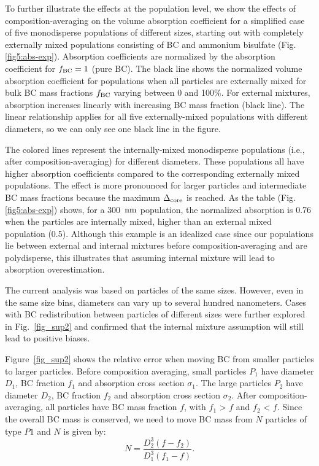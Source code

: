 \documentclass[edeposit,fullpage]{uiucthesis2009}
\makeatletter
\DeclareRobustCommand*\unit[1]
 {\ensuremath{%
   {\thinmuskip3mu\relax
    \def\mu{\text{\textmu}}\def~{\,}%
    \ifx\f@series\testbx\mathbf{#1}\else\mathrm{#1}\fi}}}
\makeatother
\begin{document}
To further illustrate the effects at the population level, we show the
effects of composition-averaging on the volume absorption coefficient
for a simplified case of five monodisperse populations of different
sizes, starting out with completely externally mixed populations
consisting of BC and ammonium bisulfate
(Fig.\ref{fig5:abs-exp}). Absorption coefficients are normalized by
the absorption coefficient for $f_{\rm BC} = 1$ (pure BC). The black
line shows the normalized volume absorption coefficient for
populations when all particles are externally mixed for bulk BC mass
fractions $f_{\rm BC}$ varying between 0 and 100\%. For external
mixtures, absorption increases linearly with increasing BC mass
fraction (black line). The linear relationship applies for all five
externally-mixed populations with different diameters, so we can only
see one black line in the figure.

The colored lines represent the internally-mixed monodisperse
populations (i.e., after composition-averaging) for different
diameters. These populations all have higher absorption coefficients
compared to the corresponding externally mixed populations. The effect
is more pronounced for larger particles and intermediate BC mass
fractions because the maximum $\Delta_{\rm core}$ is reached. As the
table (Fig.\ref{fig5:abs-exp}) shows, for a 300~\unit{nm} population,
the normalized absorption is 0.76 when the particles are internally
mixed, higher than an external mixed population (0.5). Although this
example is an idealized case since our populations lie between
external and internal mixtures before composition-averaging and are
polydisperse, this illustrates that assuming internal mixture will
lead to absorption overestimation.

The current analysis was based on particles of the same sizes. However,
even in the same size bins, diameters can vary up to several hundred
nanometers. Cases with BC redistribution between particles of
different sizes were further explored in Fig.~\ref{fig_sup2} and
confirmed that the internal mixture assumption will still lead to
positive biases.

Figure~\ref{fig_sup2} shows the relative error when moving BC
from smaller particles to larger particles. Before composition
averaging, small particles $P_1$ have diameter $D_1$, BC fraction
$f_1$ and absorption cross section $\sigma_1$. The large particles
$P_2$ have diameter $D_2$, BC fraction $f_2$ and absorption cross
section $\sigma_2$. After composition-averaging, all particles have BC
mass fraction $f$, with $f_1$ > $f$ and $f_2$ < $f$. Since the overall
BC mass is conserved, we need to move BC mass from $N$ particles of
type $P1$ and $N$ is given by:
\begin{equation}
N = \frac{D_2^3(f-f_2)}{D_1^3(f_1-f)}.
\end{equation}
\end{document}
